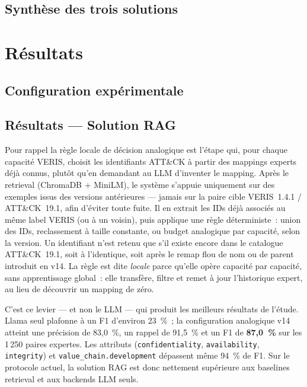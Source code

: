 \documentclass[a4paper,12pt]{article}
\begin{document}
\subsection{Synthèse des trois solutions}



\section{Résultats}

\subsection{Configuration expérimentale}



\subsection{Résultats --- Solution RAG}


Pour rappel la règle locale de décision analogique est l'étape qui, pour chaque
capacité VERIS, choisit les identifiants ATT\&CK à partir des mappings
experts déjà connus, plutôt qu'en demandant au LLM d'inventer le
mapping. Après le retrieval (ChromaDB + MiniLM), le système s'appuie
uniquement sur des exemples issus des versions antérieures --- jamais
sur la paire cible VERIS~1.4.1 / ATT\&CK~19.1, afin d'éviter toute
fuite. Il en extrait les IDs déjà associés au même label VERIS (ou à
un voisin), puis applique une règle déterministe~: union des IDs,
reclassement à taille constante, ou budget analogique par capacité,
selon la version. Un identifiant n'est retenu que s'il existe encore
dans le catalogue ATT\&CK~19.1, soit à l'identique, soit après le
remap flou de nom ou de parent introduit en v14. La règle est dite
\emph{locale} parce qu'elle opère capacité par capacité, sans
apprentissage global~: elle transfère, filtre et remet à jour
l'historique expert, au lieu de découvrir un mapping de zéro.

C'est ce levier --- et non le LLM --- qui produit les meilleurs
résultats de l'étude. Llama seul plafonne à un F1 d'environ 23~\%~;
la configuration analogique v14 atteint une précision de 83,0~\%, un
rappel de 91,5~\% et un F1 de \textbf{87,0~\%} sur les 1\,250 paires
expertes. Les attributs
(\texttt{confidentiality}, \texttt{availability}, \texttt{integrity})
et \texttt{value\_chain.development} dépassent même 94~\% de F1. Sur
le protocole actuel, la solution RAG est donc nettement supérieure
aux baselines retrieval et aux backends LLM seuls.
\end{document}
